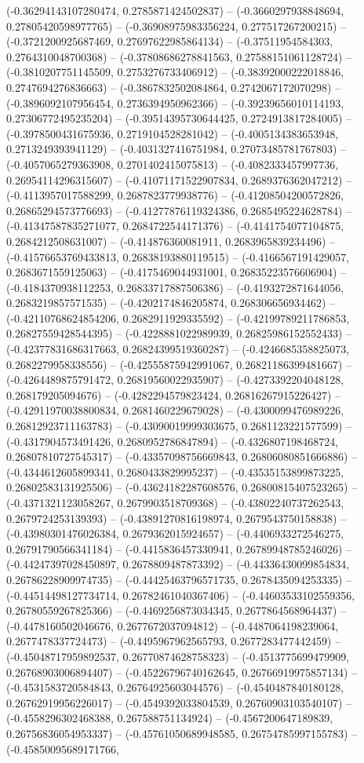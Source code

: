 (-0.36294143107280474, 0.2785871424502837) -- (-0.3660297938848694, 0.27805420598977765) -- (-0.36908975983356224, 0.277517267200215) -- (-0.3721200925687469, 0.27697622985864134) -- (-0.37511954584303, 0.2764310048700368) -- (-0.37808686278841563, 0.27588151061128724) -- (-0.3810207751145509, 0.2753276733406912) -- (-0.38392000222018846, 0.2747694276836663) -- (-0.3867832502084864, 0.2742067172070298) -- (-0.3896092107956454, 0.2736394950962366) -- (-0.39239656010114193, 0.27306772495235204) -- (-0.39514395730644425, 0.2724913817284005) -- (-0.3978500431675936, 0.2719104528281042) -- (-0.4005134383653948, 0.2713249393941129) -- (-0.4031327416751984, 0.27073485781767803) -- (-0.4057065279363908, 0.2701402415075813) -- (-0.4082333457997736, 0.26954114296315607) -- (-0.41071171522907834, 0.2689376362047212) -- (-0.4113957017588299, 0.2687823779938776) -- (-0.41208504200572826, 0.26865294573776693) -- (-0.41277876119324386, 0.2685495224628784) -- (-0.41347587835271077, 0.2684722544171376) -- (-0.4141754077104875, 0.2684212508631007) -- (-0.414876360081911, 0.2683965839234496) -- (-0.41576653769433813, 0.26838193880119515) -- (-0.4166567191429057, 0.2683671559125063) -- (-0.4175469044931001, 0.26835223576606904) -- (-0.4184370938112253, 0.26833717887506386) -- (-0.4193272871644056, 0.2683219857571535) -- (-0.4202174846205874, 0.268306656934462) -- (-0.42110768624854206, 0.2682911929335592) -- (-0.42199789211786853, 0.26827559428544395) -- (-0.4228881022989939, 0.26825986152552433) -- (-0.42377831686317663, 0.26824399519360287) -- (-0.4246685358825073, 0.2682279958338556) -- (-0.42555875942991067, 0.26821186399481667) -- (-0.4264489875791472, 0.26819560022935907) -- (-0.4273392204048128, 0.268179205094676) -- (-0.4282294579823424, 0.26816267915226427) -- (-0.42911970038800834, 0.2681460229679028) -- (-0.4300099476989226, 0.26812923711163783) -- (-0.43090019999303675, 0.2681123221577599) -- (-0.4317904573491426, 0.2680952786847894) -- (-0.4326807198468724, 0.26807810727545317) -- (-0.43357098756669843, 0.26806080851666886) -- (-0.4344612605899341, 0.2680433829995237) -- (-0.43535153899873225, 0.26802583131925506) -- (-0.43624182287608576, 0.26800815407523265) -- (-0.4371321123058267, 0.2679903518709368) -- (-0.43802240737262543, 0.2679724253139393) -- (-0.43891270816198974, 0.2679543750158838) -- (-0.43980301476026384, 0.2679362015924657) -- (-0.4406933272546275, 0.26791790566341184) -- (-0.4415836457330941, 0.26789948785246026) -- (-0.44247397028450897, 0.2678809487873392) -- (-0.44336430099854834, 0.26786228909974735) -- (-0.44425463796571735, 0.2678435094253335) -- (-0.44514498127734714, 0.26782461040367406) -- (-0.44603533102559356, 0.26780559267825366) -- (-0.4469256873034345, 0.2677864568964437) -- (-0.4478160502046676, 0.2677672037094812) -- (-0.4487064198239064, 0.2677478337724473) -- (-0.4495967962565793, 0.2677283477442459) -- (-0.45048717959892537, 0.26770874628758323) -- (-0.4513775699479909, 0.26768903006894407) -- (-0.45226796740162645, 0.26766919975857134) -- (-0.4531583720584843, 0.26764925603044576) -- (-0.4540487840180128, 0.26762919956226017) -- (-0.4549392033804539, 0.26760903103540107) -- (-0.4558296302468388, 0.267588751134924) -- (-0.4567200647189839, 0.26756836054953337) -- (-0.45761050689948585, 0.26754785997155783) -- (-0.45850095689171766, 
